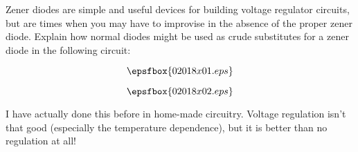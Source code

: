 

Zener diodes are simple and useful devices for building voltage regulator circuits, but are times when you may have to improvise in the absence of the proper zener diode.  Explain how normal diodes might be used as crude substitutes for a zener diode in the following circuit:

$$\epsfbox{02018x01.eps}$$







$$\epsfbox{02018x02.eps}$$







I have actually done this before in home-made circuitry.  Voltage regulation isn't that good (especially the temperature dependence), but it is better than no regulation at all!




